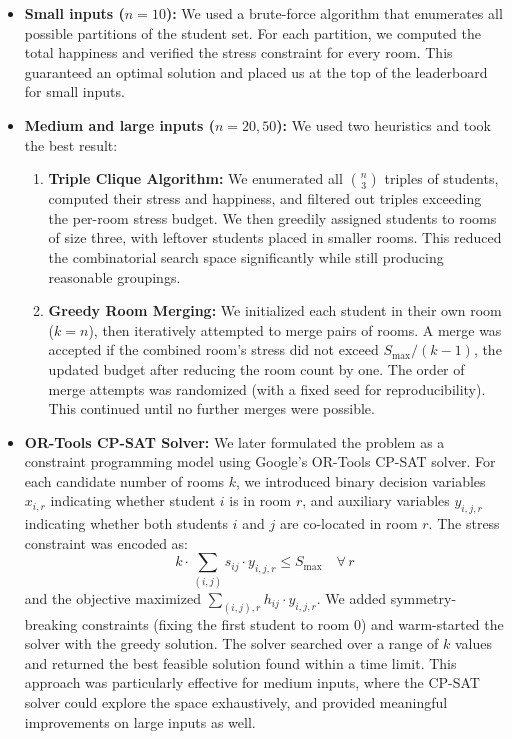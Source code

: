 \documentclass[11pt]{article}
\begin{document}
\begin{itemize}[nosep]
    \item \textbf{Small inputs ($n = 10$):} We used a brute-force algorithm that enumerates all possible partitions of the student set. For each partition, we computed the total happiness and verified the stress constraint for every room. This guaranteed an optimal solution and placed us at the top of the leaderboard for small inputs.

    \item \textbf{Medium and large inputs ($n = 20, 50$):} We used two heuristics and took the best result:
    \begin{enumerate}[nosep]
        \item \textbf{Triple Clique Algorithm:} We enumerated all $\binom{n}{3}$ triples of students, computed their stress and happiness, and filtered out triples exceeding the per-room stress budget. We then greedily assigned students to rooms of size three, with leftover students placed in smaller rooms. This reduced the combinatorial search space significantly while still producing reasonable groupings.

        \item \textbf{Greedy Room Merging:} We initialized each student in their own room ($k = n$), then iteratively attempted to merge pairs of rooms. A merge was accepted if the combined room's stress did not exceed $S_{\max} / (k - 1)$, the updated budget after reducing the room count by one. The order of merge attempts was randomized (with a fixed seed for reproducibility). This continued until no further merges were possible.
    \end{enumerate}

    \item \textbf{OR-Tools CP-SAT Solver:} We later formulated the problem as a constraint programming model using Google's OR-Tools CP-SAT solver. For each candidate number of rooms $k$, we introduced binary decision variables $x_{i,r}$ indicating whether student $i$ is in room $r$, and auxiliary variables $y_{i,j,r}$ indicating whether both students $i$ and $j$ are co-located in room $r$. The stress constraint was encoded as:
    \[
        k \cdot \sum_{(i,j)} s_{ij} \cdot y_{i,j,r} \leq S_{\max} \quad \forall\, r
    \]
    and the objective maximized $\sum_{(i,j),r} h_{ij} \cdot y_{i,j,r}$. We added symmetry-breaking constraints (fixing the first student to room 0) and warm-started the solver with the greedy solution. The solver searched over a range of $k$ values and returned the best feasible solution found within a time limit. This approach was particularly effective for medium inputs, where the CP-SAT solver could explore the space exhaustively, and provided meaningful improvements on large inputs as well.
\end{itemize}
\end{document}
